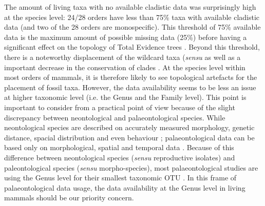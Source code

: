 \documentclass[12pt,letterpaper]{article}
\renewcommand{\subsection}[1]{%
\bigskip
\begin{center}
\begin{large}
\normalfont\itshape #1
\end{large}
\end{center}}
\begin{document}
The amount of living taxa with no available cladistic data was surprisingly high at the species level: 24/28 orders have less than 75\% taxa with available cladistic data (and two of the 28 orders are monospecific).
This threshold of 75\% available data is the maximum amount of possible missing data (25\%) before having a significant effect on the topology of Total Evidence trees \citep{GuillermeCooper}.
Beyond this threshold, there is a noteworthy displacement of the wildcard taxa (\textit{sensu} \citep{kearneyfragmentary2002} as well as a important decrease in the conservation of clades \citep{GuillermeCooper}.
At the species level within most orders of mammals, it is therefore likely to see topological artefacts for the placement of fossil taxa.
However, the data availability seems to be less an issue at higher taxonomic level (i.e. the Genus and the Family level).
This point is important to consider from a practical point of view because of the slight discrepancy between neontological and palaeontological species.
While neontological species are described on accurately measured morphology, genetic distance, spacial distribution and even behaviour \citep[e.g.][]{kellymolecular2014}; palaeontological data can be based only on morphological, spatial and temporal data \citep[e.g.][]{ni2013oldest}.
Because of this difference between neontological species (\textit{sensu} reproductive isolates) and paleontological species (\textit{sensu} morpho-species), most palaeontological studies are using the Genus level for their smallest taxonomic OTU \citep[e.g.][]{ni2013oldest,O'Leary08022013}.
In this frame of palaeontological data usage, the data availability at the Genus level in living mammals should be our priority concern.
\end{document}
